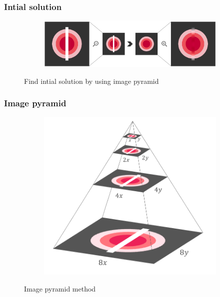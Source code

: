 \documentclass[xcolor=dvipsnames, xetex,serif]{beamer}
\begin{document}
    \begin{frame}
        \frametitle{Intial solution}
        \begin{figure}[H]
            \centering
            \begin{subfigure}{0.8\linewidth}
                \centering
                \includegraphics[width=1\linewidth]{images/image_inpaint_synthetic/image_inital_solution.png}
            \end{subfigure}
            \caption{Find intial solution by using image pyramid}
        \end{figure}
    \end{frame}
    \begin{frame}
        \frametitle{Image pyramid}
        \begin{figure}[H]
            \centering
            \begin{subfigure}{0.6\linewidth}
                \centering
                \includegraphics[width=0.8\linewidth]{images/image_inpaint_synthetic/image_pyramid.png}
            \end{subfigure}
            \caption{Image pyramid method}
        \end{figure}
        \let\thefootnote\relax{}
    \end{frame}
\end{document}
